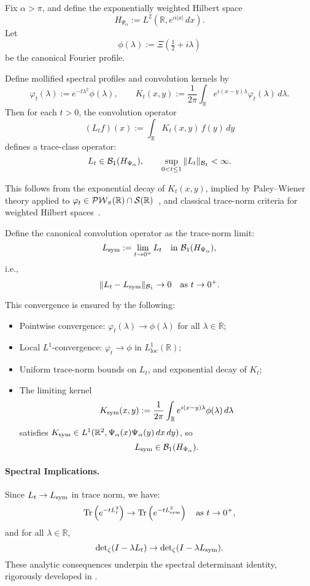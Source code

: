 \begin{lemma}
\label{lem:trace_norm_convergence_Lt_to_Lsym}
Fix \( \alpha > \pi \), and define the exponentially weighted Hilbert space
\[
H_{\Psi_\alpha} := L^2(\mathbb{R}, e^{\alpha|x|}\, dx).
\]
Let
\[
\phi(\lambda) := \Xi\left( \tfrac{1}{2} + i\lambda \right)
\]
be the canonical Fourier profile.

Define mollified spectral profiles and convolution kernels by
\[
\varphi_t(\lambda) := e^{-t\lambda^2} \phi(\lambda), \qquad
K_t(x,y) := \frac{1}{2\pi} \int_{\mathbb{R}} e^{i(x - y)\lambda} \varphi_t(\lambda)\, d\lambda.
\]
Then for each \( t > 0 \), the convolution operator
\[
(L_t f)(x) := \int_{\mathbb{R}} K_t(x, y)\, f(y)\, dy
\]
defines a trace-class operator:
\[
L_t \in \mathcal{B}_1(H_{\Psi_\alpha}), \qquad \sup_{0 < t \le 1} \| L_t \|_{\mathcal{B}_1} < \infty.
\]

\medskip
\noindent
This follows from the exponential decay of \( K_t(x,y) \), implied by Paley--Wiener theory applied to \( \varphi_t \in \mathcal{PW}_{\pi}(\mathbb{R}) \cap \mathcal{S}(\mathbb{R}) \)~\cite[Thm.~IX.12]{ReedSimon1975II}, and classical trace-norm criteria for weighted Hilbert spaces~\cite[Ch.~4]{Simon2005TraceIdeals}.

\medskip
\noindent
Define the canonical convolution operator as the trace-norm limit:
\[
L_{\mathrm{sym}} := \lim_{t \to 0^+} L_t \quad \text{in } \mathcal{B}_1(H_{\Psi_\alpha}),
\]
i.e.,
\[
\| L_t - L_{\mathrm{sym}} \|_{\mathcal{B}_1} \to 0 \quad \text{as } t \to 0^+.
\]

\medskip
\noindent
This convergence is ensured by the following:
\begin{itemize}
  \item Pointwise convergence: \( \varphi_t(\lambda) \to \phi(\lambda) \) for all \( \lambda \in \mathbb{R} \);
  \item Local \( L^1 \)-convergence: \( \varphi_t \to \phi \) in \( L^1_{\mathrm{loc}}(\mathbb{R}) \);
  \item Uniform trace-norm bounds on \( L_t \), and exponential decay of \( K_t \);
  \item The limiting kernel
  \[
  K_{\mathrm{sym}}(x,y) := \frac{1}{2\pi} \int_{\mathbb{R}} e^{i(x-y)\lambda} \phi(\lambda)\, d\lambda
  \]
  satisfies \( K_{\mathrm{sym}} \in L^1(\mathbb{R}^2, \Psi_\alpha(x)\Psi_\alpha(y)\, dx\, dy) \), so
  \[
  L_{\mathrm{sym}} \in \mathcal{B}_1(H_{\Psi_\alpha}).
  \]
\end{itemize}

\paragraph{Spectral Implications.}
Since \( L_t \to L_{\mathrm{sym}} \) in trace norm, we have:
\[
\operatorname{Tr}\left(e^{-tL_t^2}\right) \to \operatorname{Tr}\left(e^{-tL_{\mathrm{sym}}^2}\right) \quad \text{as } t \to 0^+,
\]
and for all \( \lambda \in \mathbb{R} \),
\[
\det\nolimits_{\zeta}(I - \lambda L_t) \to \det\nolimits_{\zeta}(I - \lambda L_{\mathrm{sym}}).
\]
These analytic consequences underpin the spectral determinant identity, rigorously developed in .
\end{lemma}